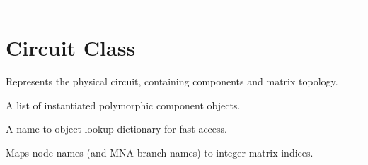 \documentclass[letterpaper,10pt,english]{sphinxmanual}
\begin{document}
\bigskip\hrule\bigskip



\section{Circuit Class}
\label{\detokenize{circuit:circuit-class}}

\begin{fulllineitems}
\label{\detokenize{circuit:Circuit}}
\pysigstartsignatures
\pysiglinewithargsret
{}
{}
{}
\pysigstopsignatures
\sphinxAtStartPar
Represents the physical circuit, containing components and matrix topology.

\begin{fulllineitems}
\label{\detokenize{circuit:Circuit.components}}
\pysigstartsignatures
\pysigline
{}
\pysigstopsignatures
\sphinxAtStartPar
A list of instantiated polymorphic component objects.

\end{fulllineitems}


\begin{fulllineitems}
\label{\detokenize{circuit:Circuit.components_dict}}
\pysigstartsignatures
\pysigline
{}
\pysigstopsignatures
\sphinxAtStartPar
A name‑to‑object lookup dictionary for fast access.

\end{fulllineitems}


\begin{fulllineitems}
\label{\detokenize{circuit:Circuit.node_map}}
\pysigstartsignatures
\pysigline
{}
\pysigstopsignatures
\sphinxAtStartPar
Maps node names (and MNA branch names) to integer matrix indices.

\end{fulllineitems}


\end{fulllineitems}
\end{document}
